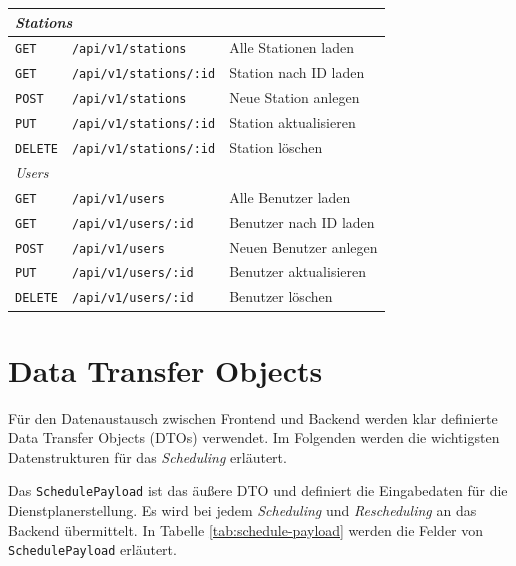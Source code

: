 \begin{table}[H]
\begin{tabularx}{\linewidth}{l >{\raggedright\arraybackslash}X >{\raggedright\arraybackslash}X}
		\multicolumn{3}{l}{\textit{Stations}} \\
		\midrule
		\texttt{GET}    & \texttt{/api/v1/stations}                          & Alle Stationen laden \\
		\texttt{GET}    & \texttt{/api/v1/stations/:id}                      & Station nach ID laden \\
		\texttt{POST}   & \texttt{/api/v1/stations}                          & Neue Station anlegen \\
		\texttt{PUT}    & \texttt{/api/v1/stations/:id}                      & Station aktualisieren \\
		\texttt{DELETE} & \texttt{/api/v1/stations/:id}                      & Station löschen \\
		\midrule
		\multicolumn{3}{l}{\textit{Users}} \\
		\midrule
		\texttt{GET}    & \texttt{/api/v1/users}                             & Alle Benutzer laden \\
		\texttt{GET}    & \texttt{/api/v1/users/:id}                         & Benutzer nach ID laden \\
		\texttt{POST}   & \texttt{/api/v1/users}                             & Neuen Benutzer anlegen \\
		\texttt{PUT}    & \texttt{/api/v1/users/:id}                         & Benutzer aktualisieren \\
		\texttt{DELETE} & \texttt{/api/v1/users/:id}                         & Benutzer löschen \\
		\bottomrule
	\end{tabularx}
\end{table}

\section{Data Transfer Objects}
Für den Datenaustausch zwischen Frontend und Backend werden klar definierte Data Transfer Objects (DTOs) verwendet.
Im Folgenden werden die wichtigsten Datenstrukturen für das \textit{Scheduling} erläutert.

Das \texttt{SchedulePayload} ist das äußere DTO und definiert die Eingabedaten für die Dienstplanerstellung. Es wird bei jedem \textit{Scheduling} und \textit{Rescheduling} an das Backend übermittelt. In Tabelle \ref{tab:schedule-payload} werden die Felder von \texttt{SchedulePayload} erläutert. 


